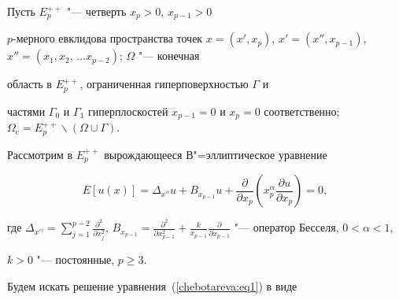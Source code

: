 \maketitle





Пусть $E_p^{++}$ "--- четверть $x_p > 0$,  $x_{p - 1} > 0$


$p$-мерного евклидова пространства точек $x = \left( {x', x_p }


\right)$,  $x' = \left( {x'', x_{p - 1} } \right)$,  $x'' = \left(


{x_{1} , x_{2} , \,\dots x_{p - 2} } \right)$;  $\Omega$ "--- конечная


область в $E_p^{++}$,  ограниченная гиперповерхностью $\Gamma $ и


частями $\Gamma _0 $ и $\Gamma _1 $ гиперплоскостей $x_{p - 1} =


0$ и $x_p = 0$ соответственно;  $\Omega _e = E_p^{ + + } \backslash


\left( {\Omega \cup \Gamma } \right)$.





Рассмотрим в $E_p^{++} $ вырождающееся В"=эллиптическое уравнение


\begin{equation}


\label{chebotareva:eq1} E\left[ {u(x)} \right] = \Delta _{x''} u +


B_{x_{p - 1} } u + \frac{\partial }{\partial x_p }\left(


{x_p^\alpha \frac{\partial u}{\partial x_p }} \right) = 0, 


\end{equation}


где $\Delta _{x{'}'} = \sum\limits_{j = 1}^{p - 2} {\frac{\partial


^2}{\partial x_j^2 }} $,  $B_{x_{p - 1} } = \frac{\partial


^2}{\partial x_{p - 1}^2 } + \frac{k}{x_{p - 1} }\frac{\partial


}{\partial x_{p - 1} }$ "--- оператор Бесселя,  $0 < \alpha < 1$, 


$k > 0$ "--- постоянные,  $p \ge 3$.







Будем искать решение уравнения~(\ref{chebotareva:eq1}) в виде





